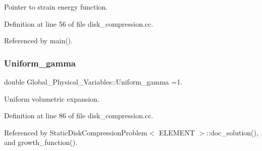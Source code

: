 Pointer to strain energy function. 



Definition at line 56 of file disk\+\_\+compression.\+cc.



Referenced by main().

\mbox{\label{namespaceGlobal__Physical__Variables_ae02b5f5b098b05fba75f3b61f381c5f7}} 
\subsubsection{\texorpdfstring{Uniform\+\_\+gamma}{Uniform\_gamma}}
{\footnotesize\ttfamily double Global\+\_\+\+Physical\+\_\+\+Variables\+::\+Uniform\+\_\+gamma =1.}



Uniform volumetric expansion. 



Definition at line 86 of file disk\+\_\+compression.\+cc.



Referenced by Static\+Disk\+Compression\+Problem$<$ E\+L\+E\+M\+E\+N\+T $>$\+::doc\+\_\+solution(), and growth\+\_\+function().

